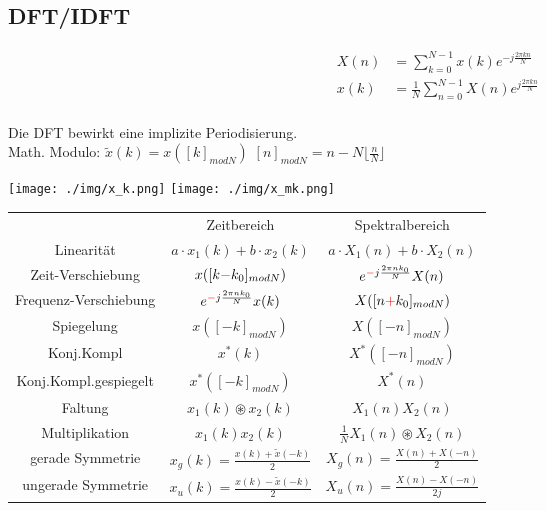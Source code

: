 \documentclass[10pt,a4paper]{article}
\begin{document}
  \subsection{DFT/IDFT}
  \begin{mdframed}[style=exercise]
    \begin{align}
        X(n)&=\sum_{k=0}^{N-1} x(k)e^{-j\frac{2\pi kn}{N}} \\
        x(k)&=\frac{1}{N}\sum_{n=0}^{N-1} X(n)e^{j\frac{2\pi kn}{N}} \\
    \end{align}
  \end{mdframed}
Die DFT bewirkt eine implizite Periodisierung. \\ 
Math. Modulo:
$\tilde{x}(k) = x([k]_{modN})$ 
$[n]_{modN}=n-N \lfloor \frac{n}{N} \rfloor$
  \begin{center}
      \texttt{[image: ./img/x\_k.png]}
      \texttt{[image: ./img/x\_mk.png]}
  \end{center}
\scriptsize
\begin{center}
\begin{tabular}{ | c | c | c | }
\cline{1-3}
        & Zeitbereich & Spektralbereich \\
\cline{1-3}
        Linearität & $a\cdot x_1(k)+ b\cdot x_2(k)$ & $a\cdot X_1(n) +b\cdot X_2(n)$ \\
\cline{1-3}
        Zeit-Verschiebung & $x([k\textcolor{red}{-}k_0]_{modN})$ & $e^{\textcolor{red}{-}j\frac{2\pi nk_0}{N}} X(n)$\\
\cline{1-3}
        Frequenz-Verschiebung & $e^{\textcolor{red}{-}j\frac{2\pi nk_0}{N}} x(k)$ & $X([n\textcolor{red}{+}k_0]_{modN})$ \\  
\cline{1-3}
        Spiegelung & $x([-k]_{modN})$ & $X([-n]_{modN})$ \\  
\cline{1-3}
        Konj.Kompl & $x^*(k)$& $X^*([-n]_{modN})$\\ 
\cline{1-3}
        Konj.Kompl.gespiegelt & $x^*([-k]_{modN})$& $X^*(n)$\\ 
\cline{1-3}
        Faltung & $x_1(k) \circledast x_2(k)$ & $X_1(n)X_2(n)$ \\  
\cline{1-3}
        Multiplikation & $x_1(k)x_2(k)$ & $\frac{1}{N} X_1(n) \circledast X_2(n)$ \\
\cline{1-3}
        gerade Symmetrie & $x_g(k)=\frac{x(k)+\tilde{x}(-k)}{2}$ & $X_g(n)=\frac{X(n)+X(-n)}{2}$ \\
\cline{1-3}
        ungerade Symmetrie & $x_u(k)=\frac{x(k)-\tilde{x}(-k)}{2}$ & $X_u(n)=\frac{X(n)-X(-n)}{2j}$ \\
\cline{1-3}
\end{tabular}
\end{center}
\end{document}

